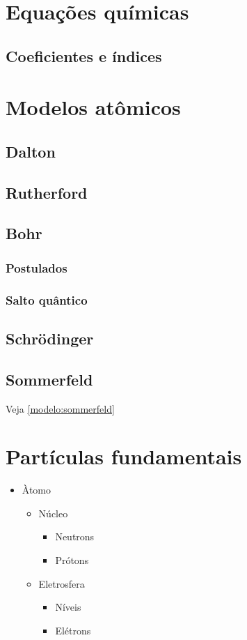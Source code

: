 \documentclass{article}
\begin{document}
\tableofcontents

\section{Equações químicas}
\subsection{Coeficientes e índices}

\section{Modelos atômicos}
\subsection{Dalton}
\subsection{Rutherford}
\subsection{Bohr}
\subsubsection{Postulados}
\subsubsection{Salto quântico}
\subsection{Schrödinger}
\subsection{Sommerfeld}
Veja \ref{modelo:sommerfeld}

\section{Partículas fundamentais}
\begin{itemize}
    \item Àtomo
    \begin{itemize}
        \item Núcleo
        \begin{itemize}
            \item Neutrons
            \item Prótons
        \end{itemize}

        \item Eletrosfera
        \begin{itemize}
            \item Níveis
            \item Elétrons
        \end{itemize}
    \end{itemize}
\end{itemize}
\end{document}
